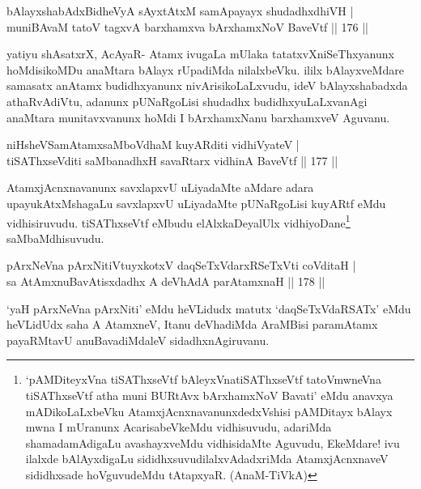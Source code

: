 \begin{shl}
bAlayxshabAdxBidheVyA sAyxtAtxM samApayayx shudadhxdhiVH |\\
muniBAvaM tatoV tagxvA barxhamxva bArxhamxNoV BaveVtf \hfill || 176 ||
\end{shl}

\begin{artha}
yatiyu shAsatxrX, AcAyaR- Atamx ivugaLa mUlaka tatatxvXniSeThxyanunx hoMdisikoMDu anaMtara bAlayx rUpadiMda nilalxbeVku. ililx bAlayxveMdare samasatx anAtamx budidhxyanunx nivArisikoLaLxvudu, ideV bAlayxshabadxda athaRvAdiVtu, adanunx pUNaRgoLisi shudadhx budidhxyuLaLxvanAgi anaMtara munitavxvanunx hoMdi I bArxhamxNanu barxhamxveV Aguvanu.
\end{artha}

\begin{shl}
niHsheVSamAtamxsaMboVdhaM kuyARditi vidhiVyateV |\\
tiSAThxseVditi saMbanadhxH savaRtarx vidhinA BaveVtf \hfill || 177 ||
\end{shl}

\begin{artha}
AtamxjAcnxnavanunx savxlapxvU uLiyadaMte aMdare adara upayukAtxMshagaLu savxlapxvU uLiyadaMte pUNaRgoLisi kuyARtf eMdu vidhisiruvudu. tiSAThxseVtf eMbudu elAlxkaDeyalUlx vidhiyoDane\footnote[2]{`pAMDiteyxVna tiSAThxseVtf bAleyxVnatiSAThxseVtf tatoVmwneVna tiSAThxseVtf atha muni BURtAvx bArxhamxNoV Bavati' eMdu anavxya mADikoLaLxbeVku AtamxjAcnxnavanunxdedxVshisi pAMDitayx bAlayx mwna I mUranunx AcarisabeVkeMdu vidhisuvudu, adariMda shamadamAdigaLu avashayxveMdu vidhisidaMte Aguvudu, EkeMdare! ivu ilalxde bAlAyxdigaLu sididhxsuvudilalxvAdadxriMda AtamxjAcnxnaveV sididhxsade hoVguvudeMdu tAtapxyaR. (AnaM-TiVkA)} saMbaMdhisuvudu.
\end{artha}


\begin{shl}
pArxNeVna pArxNitiVtuyxkotxV daqSeTxVdarxRSeTxVti coVditaH |\\
sa AtAmx\s nuBavAtisxdadhx A deVhAdA parAtamxnaH \hfill || 178 ||
\end{shl}

\begin{artha}
`yaH pArxNeVna pArxNiti' eMdu heVLidudx matutx `daqSeTxVdaRSATx' eMdu heVLidUdx saha A AtamxneV, Itanu deVhadiMda AraMBisi paramAtamx payaRMtavU anuBavadiMdaleV sidadhxnAgiruvanu.
\end{artha}

